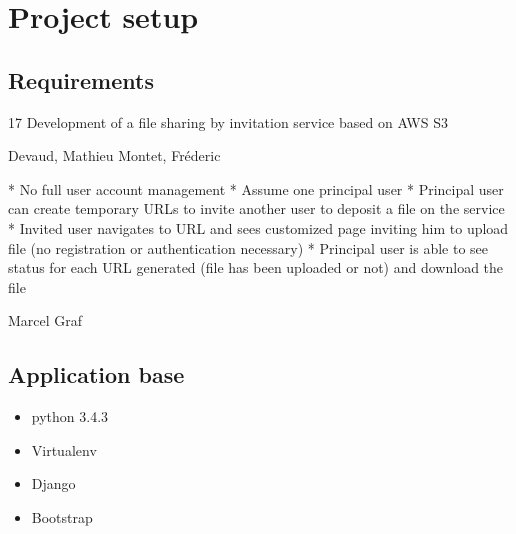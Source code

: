\chapter{Project setup}

\section{Requirements}

17 Development of a file sharing by invitation service based on AWS S3

Devaud, Mathieu
Montet, Fréderic

* No full user account management
* Assume one principal user
* Principal user can create temporary URLs to invite another user to deposit a file on the service
* Invited user navigates to URL and sees customized page inviting him
 to upload file (no registration or authentication necessary)
 * Principal user is able to see status for each URL generated (file
  has been uploaded or not) and download the file


  Marcel Graf


 \section{Application base}

\begin{itemize}
	\item python 3.4.3
	\item Virtualenv
	\item Django
	\item Bootstrap
\end{itemize}
 
